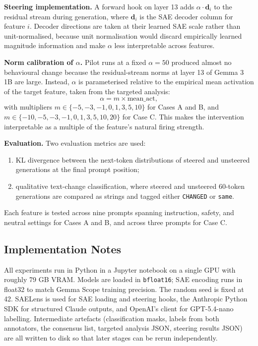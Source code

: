 \textbf{Steering implementation.} A forward hook on layer 13 adds $\alpha \cdot \mathbf{d}_i$ to the residual stream during generation, where $\mathbf{d}_i$ is the SAE decoder column for feature $i$. Decoder directions are taken at their learned SAE scale rather than unit-normalised, because unit normalisation would discard empirically learned magnitude information and make $\alpha$ less interpretable across features.

\textbf{Norm calibration of $\alpha$.} Pilot runs at a fixed $\alpha = 50$ produced almost no behavioural change because the residual-stream norms at layer 13 of Gemma 3 1B are large. Instead, $\alpha$ is parameterised relative to the empirical mean activation of the target feature, taken from the targeted analysis:
\[
    \alpha = m \times \text{mean\_act},
\]
with multipliers $m \in \{-5, -3, -1, 0, 1, 3, 5, 10\}$ for Cases A and B, and $m \in \{-10, -5, -3, -1, 0, 1, 3, 5, 10, 20\}$ for Case C. This makes the intervention interpretable as a multiple of the feature's natural firing strength.

\textbf{Evaluation.} Two evaluation metrics are used:
\begin{enumerate}
    \item KL divergence between the next-token distributions of steered and unsteered generations at the final prompt position;
    \item qualitative text-change classification, where steered and unsteered 60-token generations are compared as strings and tagged either \texttt{CHANGED} or \texttt{same}.
\end{enumerate}
Each feature is tested across nine prompts spanning instruction, safety, and neutral settings for Cases A and B, and across three prompts for Case C.

\subsection{Implementation Notes}
\label{subsec:implementation-notes}

All experiments run in Python in a Jupyter notebook on a single GPU with roughly 79 GB VRAM. Models are loaded in \texttt{bfloat16}; SAE encoding runs in float32 to match Gemma Scope training precision. The random seed is fixed at 42. SAELens is used for SAE loading and steering hooks, the Anthropic Python SDK for structured Claude outputs, and OpenAI's client for GPT-5.4-nano labelling. Intermediate artefacts (classification masks, labels from both annotators, the consensus list, targeted analysis JSON, steering results JSON) are all written to disk so that later stages can be rerun independently.
